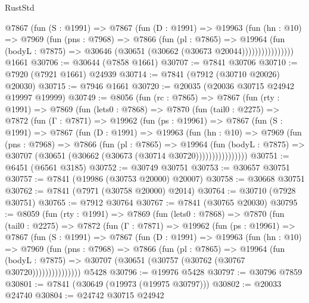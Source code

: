 \begin{lexlean}{RustStd}
\begin{coremodule}
                @7867
                  (fun (S : @1991) =>
                  @7867
                    (fun (D : @1991) =>
                    @19963
                      (fun (hn : @10) =>
                      @7969
                        (fun (pns : @7968) =>
                        @7866
                          (fun (pl : @7865) =>
                          @19964
                            (fun (bodyL : @7875) =>
                            @30646 (@30651 (@30662 (@30673 @20044))))))))))))))))
    @1661
@30706 := @30644 (@7858 @1661)
@30707 := @7841 @30706
@30710 := @7920 (@7921 @1661) @24939
@30714 := @7841 (@7912 (@30710 @20026) @20030)
@30715 := @7946 @1661
@30720 := @20035 (@20036 @30715 @24942 @19997 @19999)
@30749 := @8056
    (fun (rc : @7865) =>
    @7867
      (fun (rty : @1991) =>
      @7869
        (fun (lets0 : @7868) =>
        @7870
          (fun (tail0 : @2275) =>
          @7872
            (fun (Γ : @7871) =>
            @19962
              (fun (ps : @19961) =>
              @7867
                (fun (S : @1991) =>
                @7867
                  (fun (D : @1991) =>
                  @19963
                    (fun (hn : @10) =>
                    @7969
                      (fun (pns : @7968) =>
                      @7866
                        (fun (pl : @7865) =>
                        @19964
                          (fun (bodyL : @7875) =>
                          @30707 (@30651 (@30662 (@30673 (@30714 @30720))))))))))))))))
@30751 := @6451 (@6561 @3185)
@30752 := @30749 @30751
@30753 := @30657 @30751
@30757 := @7841 (@19986 (@30753 @20000) @20007)
@30758 := @30668 @30751
@30762 := @7841 (@7971 (@30758 @20000) @2014)
@30764 := @30710 (@7928 @30751)
@30765 := @7912 @30764
@30767 := @7841 (@30765 @20030)
@30795 := @8059
    (fun (rty : @1991) =>
    @7869
      (fun (lets0 : @7868) =>
      @7870
        (fun (tail0 : @2275) =>
        @7872
          (fun (Γ : @7871) =>
          @19962
            (fun (ps : @19961) =>
            @7867
              (fun (S : @1991) =>
              @7867
                (fun (D : @1991) =>
                @19963
                  (fun (hn : @10) =>
                  @7969
                    (fun (pns : @7968) =>
                    @7866
                      (fun (pl : @7865) =>
                      @19964
                        (fun (bodyL : @7875) =>
                        @30707 (@30651 (@30757 (@30762 (@30767 @30720)))))))))))))))
    @5428
@30796 := @19976 @5428
@30797 := @30796 @7859
@30801 := @7841 (@30649 (@19973 (@19975 @30797)))
@30802 := @20033 @24740
@30804 := @24742 @30715 @24942

\end{coremodule}
\end{lexlean}
